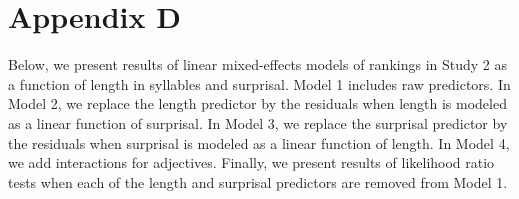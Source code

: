 \section{Appendix D}

Below, we present results of linear mixed-effects models of rankings in Study 2 as a function of length in syllables and surprisal.
Model 1 includes raw predictors.
In Model 2, we replace the length predictor by the residuals when length is modeled as a linear function of surprisal.
In Model 3, we replace the surprisal predictor by the residuals when surprisal is modeled as a linear function of length.
In Model 4, we add interactions for adjectives.
Finally, we present results of likelihood ratio tests when each of the length and surprisal predictors are removed from Model 1.

\vspace{4mm}

